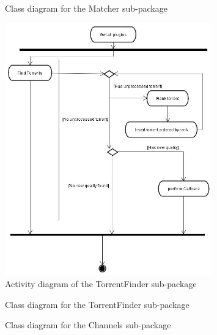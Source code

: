 \begin{figure}[hp]
  \centering
\resizebox{\linewidth}{!}{%
\tikzimgMatcher
}
  \caption{Class diagram for the Matcher sub-package}
  \label{fig:classdiagrammatcher}
\end{figure}

\begin{figure}[hp]
  \centering
      \includegraphics[width=0.8\textwidth]{TorrentFinder-activitydiagram.jpg}
  \caption{Activity diagram of the TorrentFinder sub-package}
  \label{fig:activitytorrentfinder}
\end{figure}

\begin{figure}[hp]
  \centering
\resizebox{\linewidth}{!}{%
\tikzimgTorrentFinder
}
  \caption{Class diagram for the TorrentFinder sub-package}
  \label{fig:classdiagramtorrentfinder}
\end{figure}

\begin{figure}[hp]
  \centering
\resizebox{\linewidth}{!}{%
\tikzimgChannels
}
  \caption{Class diagram for the Channels sub-package}
  \label{fig:classdiagramchannels}
\end{figure}
